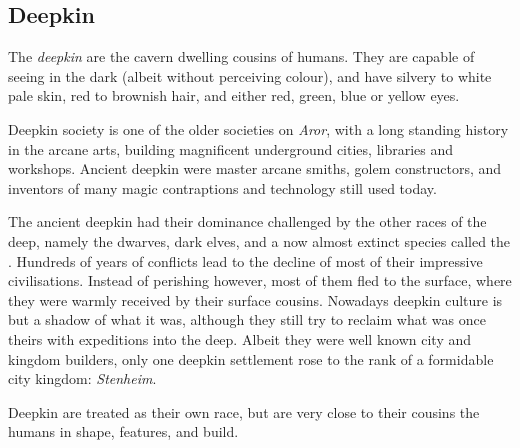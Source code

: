 \subsection{Deepkin}
\label{sec:Deepkin}



The \emph{deepkin} are the cavern dwelling cousins of humans. They are capable
of seeing in the dark (albeit without perceiving colour), and have silvery to
white pale skin, red to brownish hair, and either red, green, blue or yellow
eyes.

Deepkin society is one of the older societies on \emph{Aror}, with a long
standing history in the arcane arts, building magnificent underground cities,
libraries and workshops. Ancient deepkin were master arcane smiths, golem
constructors, and inventors of many magic contraptions and technology still
used today.

The ancient deepkin had their dominance challenged by the other races of the
deep, namely the dwarves, dark elves, and a now almost extinct species called
the . Hundreds of years of conflicts lead to the decline
of most of their impressive civilisations. Instead of perishing however, most
of them fled to the surface, where they were warmly received by their surface
cousins. Nowadays deepkin culture is but a shadow of what it was, although
they still try to reclaim what was once theirs with expeditions into the
deep. Albeit they were well known city and kingdom builders, only one deepkin
settlement rose to the rank of a formidable city kingdom: \emph{Stenheim}.

Deepkin are treated as their own race, but are very close to their cousins the
humans in shape, features, and build.

